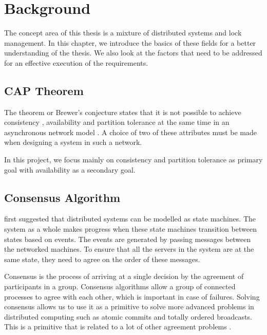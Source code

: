 \chapter{Background}
\label{chapter:background}

The concept area of this thesis is a mixture of distributed systems and lock
management. In this chapter, we introduce the basics of these fields for a
better understanding of the thesis. We also look at the factors that
need to be addressed for an effective execution of the requirements.

\section{CAP Theorem}

The  theorem or Brewer's conjecture states that it is not
possible to achieve consistency%
, availability%
and partition tolerance%
at the same time in an asynchronous network model
\citep{journals/sigact/GilbertL02}. A choice of two of these attributes must
be made when designing a system in such a network.

In this project, we focus mainly on consistency and partition tolerance%
as primary goal with availability as a secondary goal.

\section{Consensus Algorithm}

\citet{Lamclocks} first suggested that distributed systems can be modelled as
state machines. The system as a whole makes progress when these state machines
transition between states based on events. The events are  generated by passing
messages between the networked machines. To ensure that all the servers in the
system are at the same state, they need to agree on the order of these messages.

Consensus is the process of arriving at a single decision
by the agreement of participants in a
group. Consensus algorithms allow a group of connected processes to agree with
each other, which is important in case of failures. Solving consensus allows
us to use it as a primitive to solve more advanced problems in distributed
computing such as atomic commits and totally ordered broadcasts. This is a
primitive that is related to a lot of other agreement problems \citep{GS01}.

